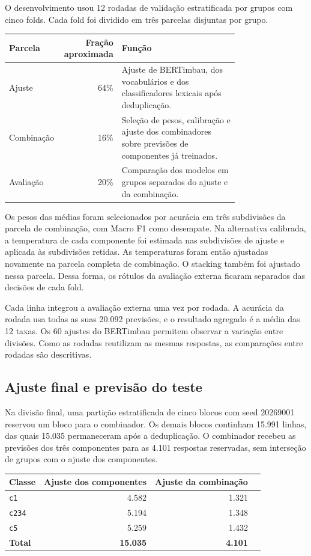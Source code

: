 \documentclass[11pt,a4paper]{article}
\begin{document}
O desenvolvimento usou 12 rodadas de validação estratificada por grupos com cinco folds. Cada fold foi dividido em três parcelas disjuntas por grupo.

\begingroup\small
\begin{longtable}{@{}p{0.24\linewidth}rp{0.52\linewidth}@{}}
\toprule
\textbf{Parcela} & \textbf{Fração aproximada} & \textbf{Função}\\
\midrule
Ajuste & 64\% & Ajuste de BERTimbau, dos vocabulários e dos classificadores lexicais após deduplicação.\\
Combinação & 16\% & Seleção de pesos, calibração e ajuste dos combinadores sobre previsões de componentes já treinados.\\
Avaliação & 20\% & Comparação dos modelos em grupos separados do ajuste e da combinação.\\
\bottomrule
\end{longtable}
\endgroup

Os pesos das médias foram selecionados por acurácia em três subdivisões da parcela de combinação, com Macro F1 como desempate. Na alternativa calibrada, a temperatura de cada componente foi estimada nas subdivisões de ajuste e aplicada às subdivisões retidas. As temperaturas foram então ajustadas novamente na parcela completa de combinação. O stacking também foi ajustado nessa parcela. Dessa forma, os rótulos da avaliação externa ficaram separados das decisões de cada fold.

Cada linha integrou a avaliação externa uma vez por rodada. A acurácia da rodada usa todas as suas 20.092 previsões, e o resultado agregado é a média das 12 taxas. Os 60 ajustes do BERTimbau permitem observar a variação entre divisões. Como as rodadas reutilizam as mesmas respostas, as comparações entre rodadas são descritivas.

\subsection{Ajuste final e previsão do teste}

Na divisão final, uma partição estratificada de cinco blocos com seed 20269001 reservou um bloco para o combinador. Os demais blocos continham 15.991 linhas, das quais 15.035 permaneceram após a deduplicação. O combinador recebeu as previsões dos três componentes para as 4.101 respostas reservadas, sem interseção de grupos com o ajuste dos componentes.

\begingroup\small
\begin{longtable}{@{}lrrr@{}}
\toprule
\textbf{Classe} & \textbf{Ajuste dos componentes} & \textbf{Ajuste da combinação}\\
\midrule
\nolinkurl{c1} & 4.582 & 1.321\\
\nolinkurl{c234} & 5.194 & 1.348\\
\nolinkurl{c5} & 5.259 & 1.432\\
\textbf{Total} & \textbf{15.035} & \textbf{4.101}\\
\bottomrule
\end{longtable}
\endgroup
\end{document}
